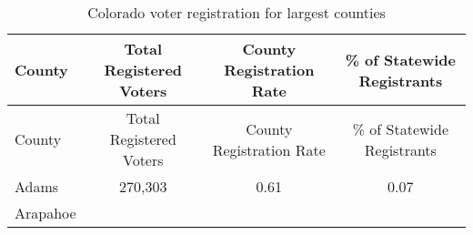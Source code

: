 \documentclass[]{article}
\begin{document}
\begin{longtable}[]{@{}lccc@{}}
\caption{Colorado voter registration for largest counties
\label{tab:voter_reg}}\tabularnewline
\toprule
\begin{minipage}[b]{0.10\columnwidth}\raggedright\strut
County\strut
\end{minipage} & \begin{minipage}[b]{0.24\columnwidth}\centering\strut
Total Registered Voters\strut
\end{minipage} & \begin{minipage}[b]{0.29\columnwidth}\centering\strut
County Registration Rate\strut
\end{minipage} & \begin{minipage}[b]{0.25\columnwidth}\centering\strut
\% of Statewide Registrants\strut
\end{minipage}\tabularnewline
\midrule
\endfirsthead
\toprule
\begin{minipage}[b]{0.10\columnwidth}\raggedright\strut
County\strut
\end{minipage} & \begin{minipage}[b]{0.24\columnwidth}\centering\strut
Total Registered Voters\strut
\end{minipage} & \begin{minipage}[b]{0.29\columnwidth}\centering\strut
County Registration Rate\strut
\end{minipage} & \begin{minipage}[b]{0.25\columnwidth}\centering\strut
\% of Statewide Registrants\strut
\end{minipage}\tabularnewline
\midrule
\endhead
\begin{minipage}[t]{0.10\columnwidth}\raggedright\strut
Adams\strut
\end{minipage} & \begin{minipage}[t]{0.24\columnwidth}\centering\strut
270,303\strut
\end{minipage} & \begin{minipage}[t]{0.29\columnwidth}\centering\strut
0.61\strut
\end{minipage} & \begin{minipage}[t]{0.25\columnwidth}\centering\strut
0.07\strut
\end{minipage}\tabularnewline
\begin{minipage}[t]{0.10\columnwidth}\raggedright\strut
Arapahoe\strut
\end{minipage} & \begin{minipage}[t]{0.24\columnwidth}\centering\strut

\end{minipage}
\end{longtable}
\end{document}
